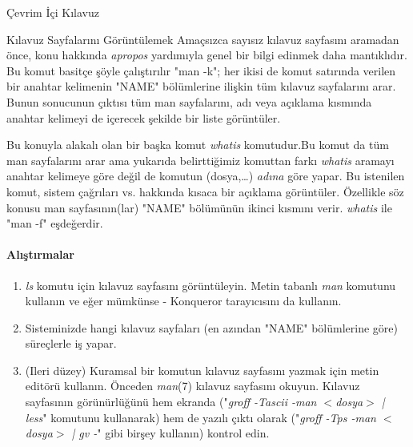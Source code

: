\begin{section}{Çevrim İçi Kılavuz}
\begin{subsection}{Kılavuz Sayfalarını Görüntülemek}
Amaçsızca sayısız kılavuz sayfasını aramadan önce, konu hakkında \emph{apropos} yardımıyla genel bir bilgi edinmek daha mantıklıdır. Bu komut basitçe şöyle çalıştırılır "man -k"; her ikisi de komut satırında verilen bir anahtar kelimenin "NAME" bölümlerine ilişkin tüm kılavuz sayfalarını arar. Bunun sonucunun çıktısı tüm man sayfalarını, adı veya açıklama kısmında anahtar kelimeyi de içerecek şekilde bir liste görüntüler.

Bu konuyla alakalı olan bir başka komut \emph{whatis} komutudur.Bu komut da tüm man sayfalarını arar ama yukarıda belirttiğimiz komuttan farkı \emph{whatis} aramayı anahtar kelimeye göre değil de komutun (dosya,\ldots) \emph{adına} göre yapar. Bu istenilen komut, sistem çağrıları vs. hakkında kısaca bir açıklama görüntüler. Özellikle söz konusu man sayfasının(lar) "NAME" bölümünün ikinci  kısmını verir. \emph{whatis} ile "man -f" eşdeğerdir.
\paragraph{{\Huge{\PencilLeftDown}}Alıştırmalar}{
\begin{enumerate}
 \item \emph{ls} komutu için kılavuz sayfasını görüntüleyin. Metin tabanlı \emph{man} komutunu kullanın ve eğer mümkünse - Konqueror tarayıcısını da kullanın.
 \item Sisteminizde hangi kılavuz sayfaları (en azından "NAME" bölümlerine göre) süreçlerle iş yapar.
 \item (Ileri düzey) Kuramsal bir komutun kılavuz sayfasını yazmak için metin editörü kullanın. Önceden \emph{man}(7) kılavuz sayfasını okuyun. Kılavuz sayfasının görünürlüğünü hem ekranda ("\emph{groff -Tascii -man $<$dosya$>$ | less}" komutunu kullanarak) hem de yazılı çıktı olarak ("\emph{groff -Tps -man $<$dosya$>$ | gv -}" gibi birşey kullanın) kontrol edin.
\end{enumerate}}
\end{subsection}
\end{section}
